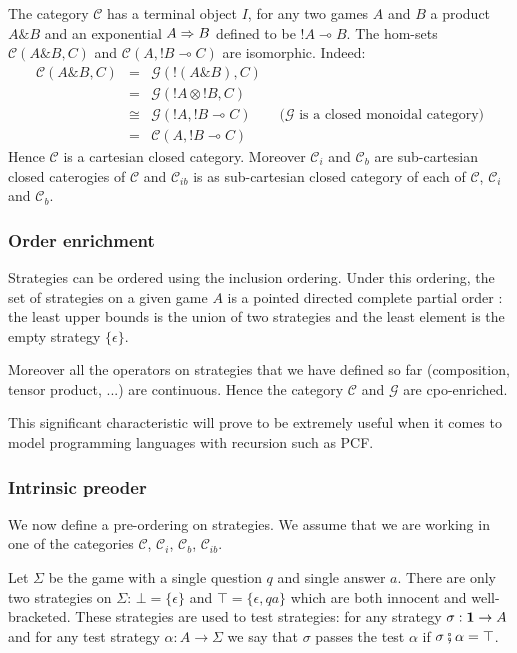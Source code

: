 The category $\mathcal{C}$ has a terminal object $I$, for any two games $A$ and $B$ a product $A \& B$ and
an exponential $A \Rightarrow B$ defined to be $!A \multimap B$. The hom-sets $\mathcal{C}(A \& B,C)$ and
$\mathcal{C}(A,!B \multimap C)$ are isomorphic. Indeed:
\begin{eqnarray*}
\mathcal{C}(A\& B,C) &=& \mathcal{G}(!(A\& B),C) \\
&=& \mathcal{G}({!A}\otimes {!B},C) \\
&\cong& \mathcal{G}({!A}, {!B} \multimap C) \qquad  \mbox{($\mathcal{G}$ is a closed monoidal category)}\\
&=& \mathcal{C}(A, {!B} \multimap C)
\end{eqnarray*}
Hence $\mathcal{C}$ is a cartesian closed category. Moreover $\mathcal{C}_i$ and $\mathcal{C}_b$
are sub-cartesian closed caterogies of $\mathcal{C}$ and $\mathcal{C}_{ib}$ is as sub-cartesian closed category
of each of $\mathcal{C}$, $\mathcal{C}_i$ and $\mathcal{C}_b$.





\subsubsection{Order enrichment}

Strategies can be ordered using the inclusion ordering. Under this
ordering, the set of strategies on a given game $A$ is a pointed
directed complete partial order : the least upper bounds is the
union of two strategies and the least element is the empty strategy
$\{ \epsilon \}$.

Moreover all the operators on strategies that we have defined so far
(composition, tensor product, ...) are continuous. Hence the
category $\mathcal{C}$ and $\mathcal{G}$ are cpo-enriched.

This significant characteristic will prove to be extremely useful
when it comes to model programming languages with recursion such as
PCF.


\subsubsection{Intrinsic preoder}

We now define a pre-ordering on strategies. We assume that we are working in one of the categories
$\mathcal{C}$, $\mathcal{C}_i$, $\mathcal{C}_b$, $\mathcal{C}_{ib}$.

Let $\Sigma$ be the game with a single question $q$ and single answer $a$. There are only two strategies on $\Sigma$:
$\bot = \{ \epsilon \}$ and $\top = \{ \epsilon, q a \}$ which are both innocent and well-bracketed. These strategies are used
to test strategies: for any strategy $\sigma : {\bf 1} \rightarrow A$ and for any test strategy $\alpha : A \rightarrow \Sigma$ we say that $\sigma$
passes the test $\alpha$ if $\sigma \fatsemi \alpha = \top$.

